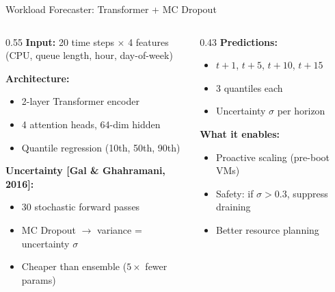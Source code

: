 \documentclass[aspectratio=169,11pt]{beamer}
\begin{document}
\begin{frame}{Workload Forecaster: Transformer + MC Dropout}
\begin{columns}[T]
\begin{column}{0.55\textwidth}
\textbf{Input:} 20 time steps $\times$ 4 features\\
(CPU, queue length, hour, day-of-week)

\vspace{0.3cm}
\textbf{Architecture:}
\begin{itemize}
  \item 2-layer Transformer encoder
  \item 4 attention heads, 64-dim hidden
  \item Quantile regression (10th, 50th, 90th)
\end{itemize}

\vspace{0.3cm}
\textbf{Uncertainty [Gal \& Ghahramani, 2016]:}
\begin{itemize}
  \item 30 stochastic forward passes
  \item MC Dropout $\to$ variance = uncertainty $\sigma$
  \item Cheaper than ensemble ($5\times$ fewer params)
\end{itemize}
\end{column}
\begin{column}{0.43\textwidth}
\textbf{Predictions:}
\begin{itemize}
  \item $t{+}1$, $t{+}5$, $t{+}10$, $t{+}15$
  \item 3 quantiles each
  \item Uncertainty $\sigma$ per horizon
\end{itemize}

\vspace{0.3cm}
\textbf{What it enables:}
\begin{itemize}
  \item Proactive scaling (pre-boot VMs)
  \item Safety: if $\sigma > 0.3$, suppress draining
  \item Better resource planning
\end{itemize}
\end{column}
\end{columns}
\end{frame}
\end{document}
